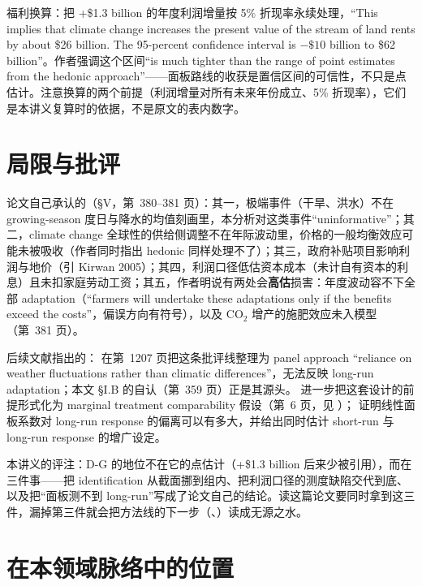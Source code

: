 福利换算：把 +\$1.3 billion 的年度利润增量按 5\% 折现率永续处理，``This implies that climate change increases the present value of the stream of land rents by about \$26 billion. The 95-percent confidence interval is $-\$10$ billion to \$62 billion''\citep[第~380 页]{deschenes2007economic}。作者强调这个区间``is much tighter than the range of point estimates from the hedonic approach''\citep[第~380 页]{deschenes2007economic}——面板路线的收获是置信区间的可信性，不只是点估计。注意换算的两个前提（利润增量对所有未来年份成立、5\% 折现率），它们是本讲义复算时的依据，不是原文的表内数字。

\section{局限与批评}

论文自己承认的（\S V，第~380--381 页）：其一，极端事件（干旱、洪水）不在 growing-season 度日与降水的均值刻画里，本分析对这类事件``uninformative''\citep[第~380 页]{deschenes2007economic}；其二，climate change 全球性的供给侧调整不在年际波动里，价格的一般均衡效应可能未被吸收（作者同时指出 hedonic 同样处理不了）；其三，政府补贴项目影响利润与地价（引 Kirwan 2005）；其四，利润口径低估资本成本（未计自有资本的利息）且未扣家庭劳动工资；其五，作者明说有两处会\textbf{高估}损害：年度波动容不下全部 adaptation（``farmers will undertake these adaptations only if the benefits exceed the costs''\citep[第~381 页]{deschenes2007economic}，偏误方向有符号），以及 CO$_2$ 增产的施肥效应未入模型（第~381 页）。

后续文献指出的：\citet{merel2021climate} 在第~1207 页把这条批评线整理为 panel approach ``reliance on weather fluctuations rather than climatic differences''，无法反映 long-run adaptation；本文 \S I.B 的自认（第~359 页）正是其源头。\citet{hsiang2016climate} 进一步把这套设计的前提形式化为 marginal treatment comparability 假设（第~6 页，见 ）； 证明线性面板系数对 long-run response 的偏离可以有多大，并给出同时估计 short-run 与 long-run response 的增广设定。

本讲义的评注：D-G 的地位不在它的点估计（+\$1.3 billion 后来少被引用），而在三件事——把 identification 从截面挪到组内、把利润口径的测度缺陷交代到底、以及把``面板测不到 long-run''写成了论文自己的结论。读这篇论文要同时拿到这三件，漏掉第三件就会把方法线的下一步（、）读成无源之水。

\section{在本领域脉络中的位置}

